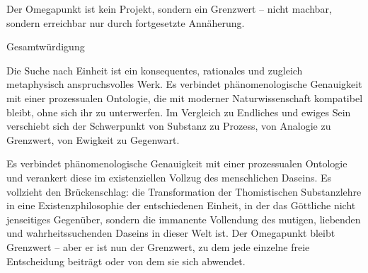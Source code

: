 \documentclass[
]{article}
\begin{document}
Der Omegapunkt ist kein Projekt, sondern ein Grenzwert -- nicht machbar, sondern erreichbar nur durch fortgesetzte Annäherung.

Gesamtwürdigung

Die Suche nach Einheit ist ein konsequentes, rationales und zugleich metaphysisch anspruchsvolles Werk. Es verbindet phänomenologische Genauigkeit mit einer prozessualen Ontologie, die mit moderner Naturwissenschaft kompatibel bleibt, ohne sich ihr zu unterwerfen. Im Vergleich zu Endliches und ewiges Sein verschiebt sich der Schwerpunkt von Substanz zu Prozess, von Analogie zu Grenzwert, von Ewigkeit zu Gegenwart.

Es verbindet phänomenologische Genauigkeit mit einer prozessualen Ontologie und verankert diese im existenziellen Vollzug des menschlichen Daseins. Es vollzieht den Brückenschlag: die Transformation der Thomistischen Substanzlehre in eine Existenzphilosophie der entschiedenen Einheit, in der das Göttliche nicht jenseitiges Gegenüber, sondern die immanente Vollendung des mutigen, liebenden und wahrheitssuchenden Daseins in dieser Welt ist. Der Omegapunkt bleibt Grenzwert -- aber er ist nun der Grenzwert, zu dem jede einzelne freie Entscheidung beiträgt oder von dem sie sich abwendet.
\end{document}
